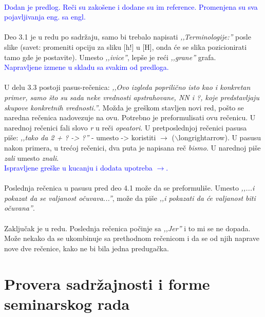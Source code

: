 \documentclass[a4paper]{report}
\newcommand{\odgovor}[1]{\textcolor{blue}{#1}}
\begin{document}
\\
\odgovor{Dodan je predlog. Reči su zakošene i dodane su im reference. Promenjena su sva pojavljivanja eng. sa engl.}
\\
\\
Deo 3.1 je u redu po sadržaju, samo bi trebalo napisati \textit{‚‚Terminologije:''} posle slike (savet: promeniti opciju za sliku [h!] u [H], onda će se slika pozicionirati tamo gde je postavite). Umesto \textit{‚‚ivice''}, lepše je reći \textit{‚‚grane''} grafa.
\\
\odgovor{Napravljene izmene u skladu sa svakim od predloga.}
\\
\\
U delu 3.3 postoji pasus-rečenica: \textit{‚‚Ovo izgleda poprilično isto kao i konkretan primer, samo što su sada neke vrednosti apstrahovane, NN i ?, koje predstavljaju skupove konkretnih vrednosti.''}. Možda je greškom stavljen novi red, pošto se naredna rečenica nadovezuje na ovu. Potrebno je preformulisati ovu rečenicu. U narednoj rečenici fali slovo \textit{r} u reči \textit{opeatori}. U pretposlednjoj rečenici pasusa piše: \textit{‚‚tako da 2 + ? -> ?''} - umesto -> koristiti $\longrightarrow$ ($\backslash$longrightarrow). U pasusu nakon primera, u trećoj rečenici, dva puta je napisana reč \textit{bismo}. U narednoj piše \textit{zali} umesto \textit{znali}.
\\
\odgovor{Ispravljene greške u kucanju i dodata upotreba \texttt{$\longrightarrow$}.}
\\
\\ 
Poslednja rečenica u pasusu pred deo 4.1 može da se preformuliše. Umesto \textit{‚‚...i pokazat da se valjanost očuvava...''}, može da piše \textit{‚‚i pokazati da će valjanost biti očuvana''}.
\\
\\
Zaključak je u redu. Poslednja rečenica počinje sa \textit{‚‚Jer''} i to mi se ne dopada. Može nekako da se ukombinuje sa prethodnom rečenicom i da se od njih naprave nove dve rečenice, kako ne bi bila jedna predugačka.

\section{Provera sadržajnosti i forme seminarskog rada}
\end{document}
